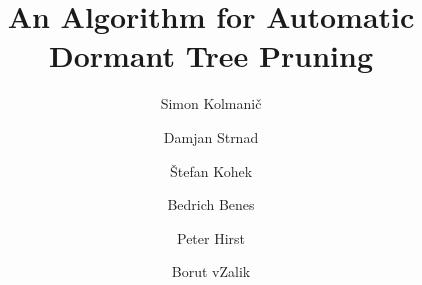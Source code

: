 \documentclass[1p]{elsarticle}
\date{}
\begin{document}
\begin{frontmatter}


\title{An Algorithm for Automatic Dormant Tree Pruning }

\author[FERI]{Simon Kolmanič}
\author[FERI]{Damjan Strnad}
\author[FERI]{\v{S}tefan Kohek}
\author[PURDUE]{Bedrich Benes}
\author[PURDUE]{Peter Hirst}
\author[FERI]{Borut v{Z}alik}

\address[FERI]{%
University of Maribor, Koroška cesta 46, 2000 Maribor, Slovenia}
\address[PURDUE]{Purdue University West Lafayette, IN 47906, USA}







\end{frontmatter}










\end{document}
